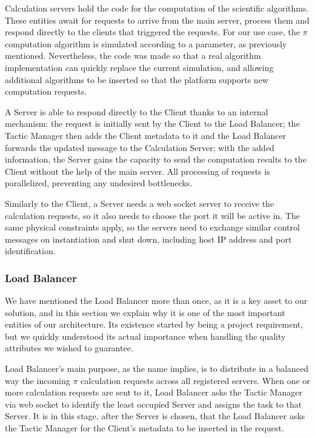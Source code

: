 \documentclass[12pt]{article}
\begin{document}
Calculation servers hold the code for the computation of the scientific algorithms.
These entities await for requests to arrive from the main server, process them and respond directly to the clients that triggered the requests.
For our use case, the $\pi$ computation algorithm is simulated according to a parameter, as previously mentioned.
Nevertheless, the code was made so that a real algorithm implementation can quickly replace the current simulation, and allowing additional algorithms to be 
inserted so that the platform supports new computation requests.

A Server is able to respond directly to the Client thanks to an internal mechanism:
the request is initially sent by the Client to the Load Balancer;
the Tactic Manager then adds the Client metadata to it and the Load Balancer forwards the updated message to the Calculation Server;
with the added information, the Server gains the capacity to send the computation results to the Client without the help of the main server.
All processing of requests is parallelized, preventing any undesired bottlenecks.

Similarly to the Client, a Server needs a web socket server to receive the calculation requests, so it also needs to choose the port it will be active in. 
The same physical constraints apply, so the servers need to exchange similar control messages on instantiation and shut down, including host IP address and port identification.

\subsubsection{Load Balancer} \label{lb}

We have mentioned the Load Balancer more than once, as it is a key asset to our solution, and in this section we explain why it is one of the most important 
entities of our architecture.
Its existence started by being a project requirement, but we quickly understood its actual importance when handling the quality attributes we wished to guarantee.

Load Balancer's main purpose, as the name implies, is to distribute in a balanced way the incoming $\pi$ calculation requests across all registered servers. 
When one or more calculation requests are sent to it, Load Balancer asks the Tactic Manager via web socket to identify the least occupied Server and assigns the 
task to that Server.
It is in this stage, after the Server is chosen, that the Load Balancer asks the Tactic Manager for the Client's metadata to be inserted in the request.
\end{document}
